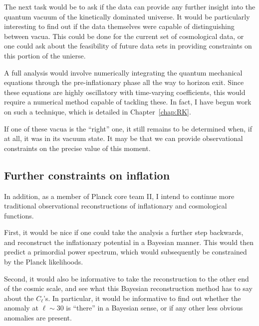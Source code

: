 The next task would be to ask if the data can provide any further insight into the quantum vacuum of the kinetically dominated universe. It would be particularly interesting to find out if the data themselves were capable of distinguishing between vacua. This could be done for the current set of cosmological data, or one could ask about the feasibility of future data sets in providing constraints on this portion of the unierse.

A full analysis would involve numerically integrating the quantum mechanical equations through the pre-inflationary phase all the way to horizon exit. Since these equations are highly oscillatory with time-varying coefficients, this would require a numerical method capable of tackling these. In fact, I have begun work on such a technique, which is detailed in Chapter~\ref{chap:RK}.

If one of these vacua is the ``right'' one, it still remains to be determined when, if at all, it was in its vacuum state. It may be that we can provide observational constraints on the precise value of this moment.

\subsection{Further constraints on inflation}
In addition, as a member of Planck core team II, I intend to continue more traditional observational reconstructions of inflationary and cosmological functions. 

First, it would be nice if one could take the analysis a further step backwards, and reconstruct the inflationary potential in a Bayesian manner. This would then predict a primordial power spectrum, which would subsequently be constrained by the Planck likelihoods.

Second, it would also be informative to take the reconstruction to the other end of the cosmic scale, and see what this Bayesian reconstruction method has to say about the $C_\ell$'s. In particular, it would be informative to find out whether the anomaly at $\ell\sim30$ is ``there'' in a Bayesian sense, or if any other less obvious anomalies are present.

\cleardoublepage{}
